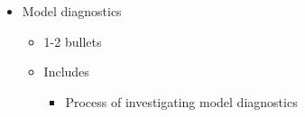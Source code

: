 \documentclass[
  letterpaper,
  DIV=11,
  numbers=noendperiod]{scrartcl}
\providecommand{\tightlist}{%
  \setlength{\itemsep}{0pt}\setlength{\parskip}{0pt}}
\begin{document}
\begin{itemize}
\begin{itemize}
    \begin{itemize}
    \tightlist
    \item
      1 bullet
    \item
      \textbf{Only for {purposeful model selection}!!}

      \begin{itemize}
      \tightlist
      \item
        In {LASSO}, the final model is more of a result
      \end{itemize}
    \item
      Write out your final model: It can be an equation, but a list
      might be nicer.

      \begin{itemize}
      \tightlist
      \item
        Example: Our final model included main effects for \_\_\_\_ and
        an interaction between \_\_ and \_\_.
      \end{itemize}
    \end{itemize}
  \item
    Model diagnostics

    \begin{itemize}
    \tightlist
    \item
      1-2 bullets
    \item
      Includes

      \begin{itemize}
      \tightlist
      \item
        Process of investigating model diagnostics
      \end{itemize}
    \end{itemize}
  \end{itemize}
\end{itemize}
\end{document}

